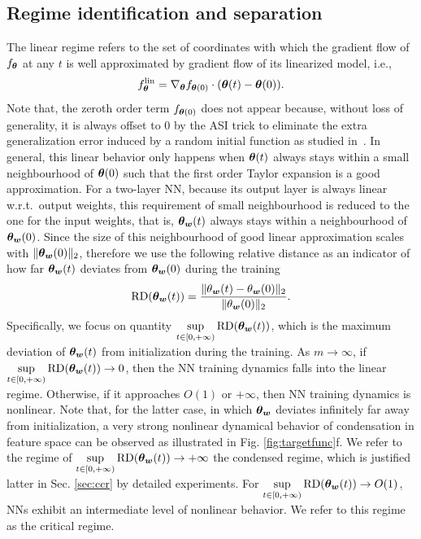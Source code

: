 \documentclass{article}
\begin{document}
\subsection{Regime identification and separation}
The linear regime refers to the set of coordinates with which the gradient flow of $f_{\bm{\theta}}$ at any $t$ is well approximated by gradient flow of its linearized model, i.e.,
\begin{equation}
    f^{\mathrm{lin}}_{\bm{\theta}}=\nabla_{\bm{\theta}}f_{\bm{\theta}(0)}\cdot(\bm{\theta}(t)-\bm{\theta}(0)).
\end{equation}
Note that, the zeroth order term $f_{\bm{\theta}(0)}$ does not appear because, without loss of generality, it is always offset to $0$ by the ASI trick to eliminate the extra generalization error induced by a random initial function as studied in~\cite{zhang_type_2019}. In general, this linear behavior only happens when $\bm{\theta}(t)$ always stays within a small neighbourhood of $\bm{\theta}(0)$ such that the first order Taylor expansion is a good approximation. For a two-layer NN, because its output layer is always linear w.r.t.\  output weights, this requirement of small neighbourhood is reduced to the one for the input weights, that is, $\bm{\theta}_{\bm{w}}(t)$ always stays within a neighbourhood of $\bm{\theta}_{\bm{w}}(0)$. Since the size of this neighbourhood of good linear approximation scales with $\lVert\bm{\theta}_{\bm{w}}(0)\rVert_{2}$, therefore we use the following relative distance as an indicator of how far $\bm{\theta}_{\bm{w}}(t)$ deviates from $\bm{\theta}_{\bm{w}}(0)$ during the training
\begin{equation}
    \mathrm{RD}(\bm{\theta}_{\bm{w}}(t))=\frac{\lVert\theta_{\bm{w}}(t)-\theta_{\bm{w}}(0)\rVert_{2}}{\lVert\theta_{\bm{w}}(0)\rVert_{2}}.
\end{equation}
Specifically, we focus on quantity $\sup\limits_{t\in[0,+\infty)}\mathrm{RD}(\bm{\theta}_{\bm{w}}(t))$, which is the maximum deviation of $\bm{\theta}_{\bm{w}}(t)$ from initialization during the training. As $m\to\infty$, if $\sup\limits_{t\in[0,+\infty)}\mathrm{RD}(\bm{\theta}_{\bm{w}}(t))\to 0$, then the NN training dynamics falls into the linear regime. Otherwise, if it approaches $O(1)$ or $+\infty$, then NN training dynamics is nonlinear. Note that, for the latter case, in which $\bm{\theta}_{\bm{w}}$ deviates infinitely far away from initialization, a very strong nonlinear dynamical behavior of condensation in feature space can be observed as illustrated in Fig. \ref{fig:targetfunc}f. We refer to the regime of $\sup\limits_{t\in[0,+\infty)}\mathrm{RD}(\bm{\theta}_{\bm{w}}(t))\to +\infty$ the condensed regime, which is justified latter in Sec. \ref{sec:ccr} by detailed experiments. For $\sup\limits_{t\in[0,+\infty)}\mathrm{RD}(\bm{\theta}_{\bm{w}}(t))\to O(1)$, NNs exhibit an intermediate level of nonlinear behavior. We refer to this regime as the critical regime.
\end{document}

